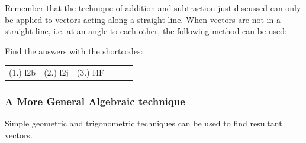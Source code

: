           \label{m38816*id191575}Remember that the technique of addition and subtraction just discussed can only be applied to vectors acting along a straight line. When vectors are not in a straight line, i.e. at an angle to each other, the following method can be used:\par 
        
        \label{m38816*uid65}
\par {} Find the answers with the shortcodes:
 \par \begin{tabular}[h]{cccccc}
 (1.) l2b  &  (2.) l2j  &  (3.) l4F  & \end{tabular}



            \subsubsection{ A More General Algebraic technique}
            \nopagebreak
            
          
          \label{m38816*id191590}Simple geometric and trigonometric techniques can be used to find resultant vectors.\par 
\label{m38816*secfhsst!!!underscore!!!id1442}\vspace{.5cm} 
      
